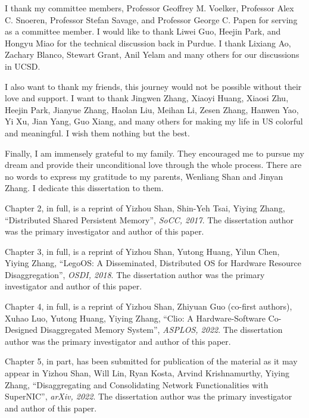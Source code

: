 \begin{acknowledgements}
I thank my committee members, Professor Geoffrey M. Voelker, Professor Alex C. Snoeren, Professor Stefan Savage, and Professor George C. Papen for serving as a committee member.
%
I would like to thank Liwei Guo, Heejin Park, and Hongyu Miao for the technical discussion back in Purdue. I thank Lixiang Ao, Zachary Blanco, Stewart Grant, Anil Yelam and many others for our discussions in UCSD.

I also want to thank my friends, this journey would not be possible without their love and support. I want to thank Jingwen Zhang, Xiaoyi Huang, Xiaosi Zhu, Heejin Park, Jianyue Zhang, Haolan Liu, Meihan Li, Zesen Zhang, Hanwen Yao, Yi Xu, Jian Yang, Guo Xiang, and many others for making my life in US colorful and meaningful. I wish them nothing but the best.

Finally, I am immensely grateful to my family.
They encouraged me to pursue my dream and provide their unconditional love
through the whole process. There are no words to express my gratitude to my parents, Wenliang Shan and Jinyan Zhang. I dedicate this dissertation to them.

\hfill \break

Chapter 2, in full, is a reprint of Yizhou Shan, Shin-Yeh Tsai, Yiying Zhang, ``Distributed Shared Persistent Memory'', \textit{SoCC, 2017}. The dissertation author was the primary investigator and author of this paper.

Chapter 3, in full, is a reprint of Yizhou Shan, Yutong Huang, Yilun Chen, Yiying Zhang, ``LegoOS: A Disseminated, Distributed OS for Hardware Resource Disaggregation'', \textit{OSDI, 2018}. The dissertation author was the primary investigator and author of this paper.

Chapter 4, in full, is a reprint of Yizhou Shan, Zhiyuan Guo (co-first authors), Xuhao Luo, Yutong Huang, Yiying Zhang, ``Clio: A Hardware-Software Co-Designed Disaggregated Memory System'', \textit{ASPLOS, 2022}. The dissertation author was the primary investigator and author of this paper.

Chapter 5, in part, has been submitted for publication of the material as it may appear in Yizhou Shan, Will Lin, Ryan Kosta, Arvind Krishnamurthy, Yiying Zhang, ``Disaggregating and Consolidating Network Functionalities with SuperNIC'', \textit{arXiv, 2022}. The dissertation author was the primary investigator and author of this paper.

\end{acknowledgements}
